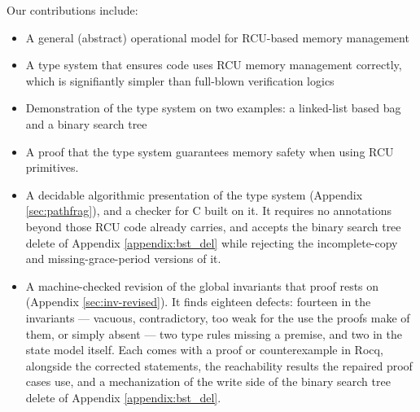 Our contributions include:
\begin{itemize}
\item A general (abstract) operational model for RCU-based memory management
\item A type system that ensures code uses RCU memory management correctly, which is signifiantly simpler than full-blown verification logics
\item Demonstration of the type system on two examples: a linked-list based bag and a binary search tree  
\item A proof that the type system guarantees memory safety when using RCU primitives.
\item A decidable algorithmic presentation of the type system (Appendix \ref{sec:pathfrag}), and a checker for C built on it.  It requires no annotations beyond those RCU code already carries, and accepts the binary search tree delete of Appendix \ref{appendix:bst_del} while rejecting the incomplete-copy and missing-grace-period versions of it.
\item A machine-checked revision of the global invariants that proof rests on (Appendix \ref{sec:inv-revised}).  It finds eighteen defects: fourteen in the invariants --- vacuous, contradictory, too weak for the use the proofs make of them, or simply absent --- two type rules missing a premise, and two in the state model itself.  Each comes with a proof or counterexample in Rocq, alongside the corrected statements, the reachability results the repaired proof cases use, and a mechanization of the write side of the binary search tree delete of Appendix \ref{appendix:bst_del}.
\end{itemize}
